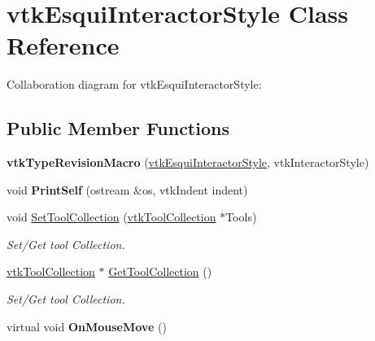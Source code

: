 \hypertarget{classvtkEsquiInteractorStyle}{
\section{vtkEsquiInteractorStyle Class Reference}
\label{classvtkEsquiInteractorStyle}
}
Collaboration diagram for vtkEsquiInteractorStyle:\subsection*{Public Member Functions}
\begin{DoxyCompactItemize}
\item 
\hypertarget{classvtkEsquiInteractorStyle_a3c2d2d94ab2fb1e254e88bbac3e3f772}{
{\bfseries vtkTypeRevisionMacro} (\hyperlink{classvtkEsquiInteractorStyle}{vtkEsquiInteractorStyle}, vtkInteractorStyle)}
\label{classvtkEsquiInteractorStyle_a3c2d2d94ab2fb1e254e88bbac3e3f772}

\item 
\hypertarget{classvtkEsquiInteractorStyle_ab019f7da03f14eed068dd0c2b40a177f}{
void {\bfseries PrintSelf} (ostream \&os, vtkIndent indent)}
\label{classvtkEsquiInteractorStyle_ab019f7da03f14eed068dd0c2b40a177f}

\item 
\hypertarget{classvtkEsquiInteractorStyle_a4232e061d5365b9678547d6ae1c9510d}{
void \hyperlink{classvtkEsquiInteractorStyle_a4232e061d5365b9678547d6ae1c9510d}{SetToolCollection} (\hyperlink{classvtkToolCollection}{vtkToolCollection} $\ast$Tools)}
\label{classvtkEsquiInteractorStyle_a4232e061d5365b9678547d6ae1c9510d}

\begin{DoxyCompactList}\small\item\em Set/Get tool Collection. \item\end{DoxyCompactList}\item 
\hypertarget{classvtkEsquiInteractorStyle_a965f5eb38c0912b7063d59a610b98491}{
\hyperlink{classvtkToolCollection}{vtkToolCollection} $\ast$ \hyperlink{classvtkEsquiInteractorStyle_a965f5eb38c0912b7063d59a610b98491}{GetToolCollection} ()}
\label{classvtkEsquiInteractorStyle_a965f5eb38c0912b7063d59a610b98491}

\begin{DoxyCompactList}\small\item\em Set/Get tool Collection. \item\end{DoxyCompactList}\item 
\hypertarget{classvtkEsquiInteractorStyle_a8e41d25c2ebffc6b91fc020795e09850}{
virtual void {\bfseries OnMouseMove} ()}
\label{classvtkEsquiInteractorStyle_a8e41d25c2ebffc6b91fc020795e09850}


\end{DoxyCompactItemize}
